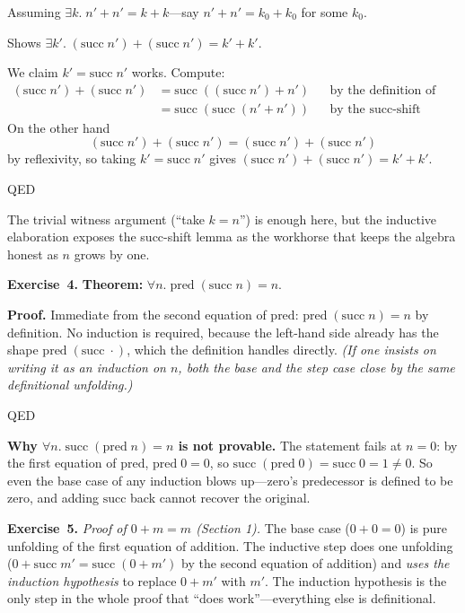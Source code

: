 \documentclass[11pt]{article}
\begin{document}
Assuming $\exists k.\; n' + n' = k + k$---say $n' + n' = k_0 + k_0$ for
some $k_0$.

Shows $\exists k'.\; (\text{succ}\; n') + (\text{succ}\; n') = k' + k'$.

We claim $k' = \text{succ}\; n'$ works.  Compute:
\begin{align*}
(\text{succ}\; n') + (\text{succ}\; n')
  &= \text{succ}\;((\text{succ}\; n') + n')
    && \text{by the definition of addition} \\
  &= \text{succ}\;(\text{succ}\;(n' + n'))
    && \text{by the succ-shift lemma in Section 2}
\end{align*}
On the other hand
\[
  (\text{succ}\; n') + (\text{succ}\; n')
    = (\text{succ}\; n') + (\text{succ}\; n')
\]
by reflexivity, so taking $k' = \text{succ}\; n'$ gives
$(\text{succ}\; n') + (\text{succ}\; n') = k' + k'$.

QED

The trivial witness argument (``take $k = n$'') is enough here, but
the inductive elaboration exposes the succ-shift lemma as the workhorse
that keeps the algebra honest as $n$ grows by one.

\medskip
\textbf{Exercise~4.}
\textbf{Theorem:} $\forall n.\; \text{pred}\;(\text{succ}\; n) = n$.

\textbf{Proof.}  Immediate from the second equation of $\text{pred}$:
$\text{pred}\;(\text{succ}\; n) = n$ by definition.  No induction is
required, because the left-hand side already has the shape
$\text{pred}\;(\text{succ}\; \cdot)$, which the definition handles
directly.  \emph{(If one insists on writing it as an induction on $n$,
both the base and the step case close by the same definitional
unfolding.)}

QED

\textbf{Why $\forall n.\; \text{succ}\;(\text{pred}\; n) = n$ is not
provable.}  The statement fails at $n = 0$: by the first equation of
$\text{pred}$, $\text{pred}\; 0 = 0$, so
$\text{succ}\;(\text{pred}\; 0) = \text{succ}\; 0 = 1 \neq 0$.  So even
the base case of any induction blows up---zero's predecessor is
defined to be zero, and adding $\text{succ}$ back cannot recover the
original.

\medskip
\textbf{Exercise~5.}
\emph{Proof of $0 + m = m$ (Section 1).}  The base case
($0 + 0 = 0$) is pure unfolding of the first equation of addition.
The inductive step does one unfolding ($0 + \text{succ}\; m' =
\text{succ}\;(0 + m')$ by the second equation of addition) and
\emph{uses the induction hypothesis} to replace $0 + m'$ with $m'$.
The induction hypothesis is the only step in the whole proof that
``does work''---everything else is definitional.
\end{document}

